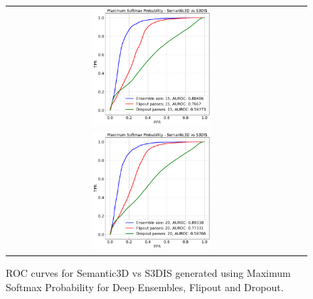 \begin{figure}
\begin{tabular}{cc}
            \includegraphics[width = 0.42\textwidth, height= 0.3\textheight]{images/AUROC/MSP_15.pdf} \\ 
            \includegraphics[width = 0.42\textwidth, height= 0.3\textheight]{images/AUROC/MSP_20.pdf} &
            \\
        \end{tabular}
        \caption{ROC curves for Semantic3D vs S3DIS generated using Maximum Softmax Probability for Deep Ensembles, Flipout and Dropout.}
        \label{fig:roc_msp_ood_1}
    \end{figure}
